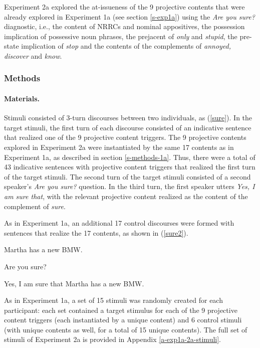 \documentclass[11pt,fleqn]{article}
\newcommand{\6}{\mbox{$[\hspace*{-.6mm}[$}}
\newcommand{\9}{\mbox{$]\hspace*{-.6mm}]$}}
\begin{document}
Experiment 2a explored the at-issueness of the 9 projective contents that were already explored in Experiment 1a (see section \ref{s-exp1a}) using the {\em Are you sure?} diagnostic, i.e., the content of NRRCs and nominal appositives, the possession implication of possessive noun phrases, the prejacent of {\em only} and {\em stupid}, the pre-state implication of {\em stop} and the contents of the complements of {\em annoyed, discover} and {\em know}.

\subsubsection{Methods}\label{s-methods-2a}

\paragraph{Materials.} Stimuli consisted of 3-turn discourses between two individuals, as (\ref{sure}). In the target stimuli, the first turn of each discourse consisted of an indicative sentence that realized one of the 9 projective content triggers. The 9 projective contents explored in Experiment 2a were instantiated by the same 17 contents as in Experiment 1a, as described in section \ref{s-methods-1a}. Thus, there were a total of 43 indicative sentences with projective content triggers that realized the first turn of the target stimuli. The second turn of the target stimuli consisted of a second speaker's {\em Are you sure?} question. In the third turn, the first speaker utters {\em Yes, I am sure that}, with the relevant projective content realized as the content of the complement of {\em sure}. 

As in Experiment 1a, an additional 17 control discourses were formed with sentences that realize the 17 contents, as shown in (\ref{sure2}).

\begin{exe}
\ex\label{sure2}
\begin{xlist}
 Martha has a new BMW.

 Are you sure?

 Yes, I am sure that Martha has a new BMW.
\end{xlist}
\end{exe}
As in Experiment 1a, a set of 15 stimuli was randomly created for each participant: each set contained a target stimulus for each of the 9 projective content triggers (each  instantiated by a unique content) and 6 control stimuli (with unique contents as well, for a total of 15 unique contents). The full set of stimuli of Experiment 2a is provided in Appendix \ref{a-exp1a-2a-stimuli}.
\end{document}
